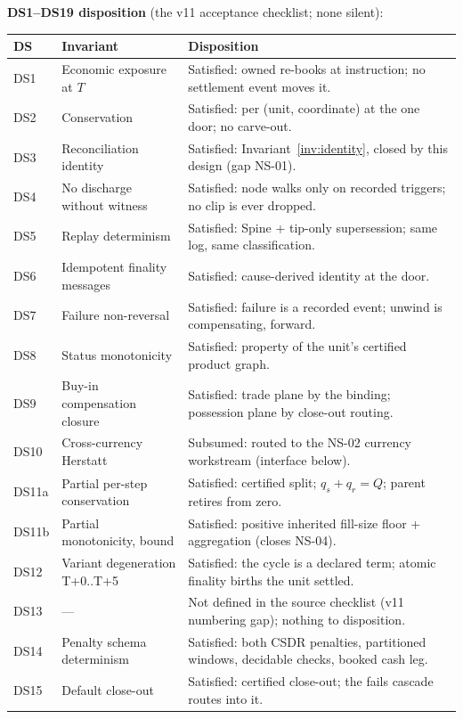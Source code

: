 \documentclass[11pt]{article}
\begin{document}
\textbf{DS1--DS19 disposition} (the v11 acceptance checklist; none silent):

{\footnotesize\renewcommand{\arraystretch}{0.88}
\setlength{\LTpre}{4pt}\setlength{\LTpost}{4pt}
\begin{longtable}{@{}llp{8.6cm}@{}}
\toprule
DS & Invariant & Disposition \\
\midrule
DS1 & Economic exposure at $T$ & Satisfied: owned re-books at instruction; no settlement event moves it. \\
DS2 & Conservation & Satisfied: per (unit, coordinate) at the one door; no carve-out. \\
DS3 & Reconciliation identity & Satisfied: Invariant~\ref{inv:identity}, closed by this design (gap NS-01). \\
DS4 & No discharge without witness & Satisfied: node walks only on recorded triggers; no clip is ever dropped. \\
DS5 & Replay determinism & Satisfied: Spine + tip-only supersession; same log, same classification. \\
DS6 & Idempotent finality messages & Satisfied: cause-derived identity at the door. \\
DS7 & Failure non-reversal & Satisfied: failure is a recorded event; unwind is compensating, forward. \\
DS8 & Status monotonicity & Satisfied: property of the unit's certified product graph. \\
DS9 & Buy-in compensation closure & Satisfied: trade plane by the binding; possession plane by close-out routing. \\
DS10 & Cross-currency Herstatt & Subsumed: routed to the NS-02 currency workstream (interface below). \\
DS11a & Partial per-step conservation & Satisfied: certified split; $q_s + q_r = Q$; parent retires from zero. \\
DS11b & Partial monotonicity, bound & Satisfied: positive inherited fill-size floor + aggregation (closes NS-04). \\
DS12 & Variant degeneration T+0..T+5 & Satisfied: the cycle is a declared term; atomic finality births the unit settled. \\
DS13 & --- & Not defined in the source checklist (v11 numbering gap); nothing to disposition. \\
DS14 & Penalty schema determinism & Satisfied: both CSDR penalties, partitioned windows, decidable checks, booked cash leg. \\
DS15 & Default close-out & Satisfied: certified close-out; the fails cascade routes into it. \\

\end{longtable}}
\end{document}
